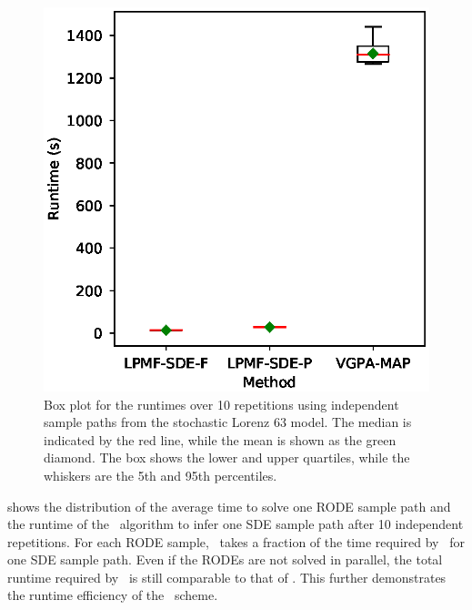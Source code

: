 \begin{figure}
    \centering
    \includegraphics[width=0.48\linewidth]{graphics/lorenz-63-runtime-boxplot}
    \caption{Box plot for the runtimes over 10 repetitions using independent sample paths from the stochastic Lorenz 63 model. The median is indicated by the red line, while the mean is shown as the green diamond. The box shows the lower and upper quartiles, while the whiskers are the 5th and 95th percentiles.}
    \label{fig-lorenz-63-runtime-boxplot}    
\end{figure}

 shows the distribution of the average time to solve one RODE sample path and the runtime of the \algovgpamap\ algorithm to infer one SDE sample path after 10 independent repetitions. 
For each RODE sample, \algolpmfsde\ takes a fraction of the time required by \algovgpamap\ for one SDE sample path.
Even if the RODEs are not solved in parallel, the total runtime required by \algolpmfsde\ is still comparable to that of \algovgpamap. 
This further demonstrates the runtime efficiency of the \algolpmfsde\ scheme.

